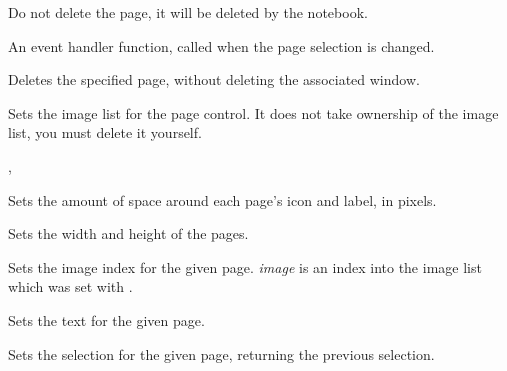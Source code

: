 Do not delete the page, it will be deleted by the notebook.



\label{wxnotebookonselchange}


An event handler function, called when the page selection is changed.



\label{wxnotebookremovepage}


Deletes the specified page, without deleting the associated window.

\label{wxnotebooksetimagelist}


Sets the image list for the page control. It does not take
ownership of the image list, you must delete it yourself.


,

\label{wxnotebooksetpadding}


Sets the amount of space around each page's icon and label, in pixels.

\label{wxnotebooksetpagesize}


Sets the width and height of the pages.

\label{wxnotebooksetpageimage}


Sets the image index for the given page. {\it image} is an index into
the image list which was set with .

\label{wxnotebooksetpagetext}


Sets the text for the given page.

\label{wxnotebooksetselection}


Sets the selection for the given page, returning the previous selection.




